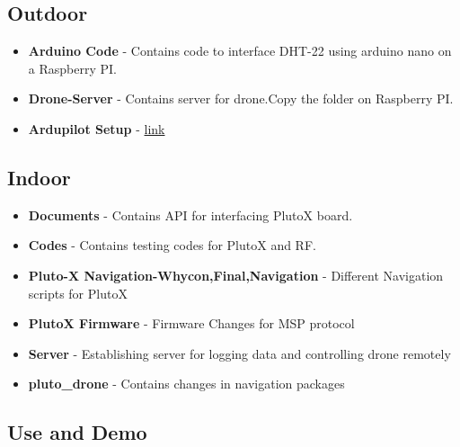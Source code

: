 \documentclass[a4paper,12pt,oneside]{book}
\begin{document}
\subsection*{Outdoor}
\begin{itemize}
\item \textbf{Arduino Code} - Contains code to interface DHT-22 using arduino nano on a Raspberry PI.
\item \textbf{Drone-Server} - Contains server for drone.Copy the folder on Raspberry PI.
\item \textbf{Ardupilot Setup} - \href{https://docs.emlid.com/navio2/}{link}

\end{itemize}

\subsection*{Indoor}
\begin{itemize}
\item \textbf{Documents} - Contains API for interfacing PlutoX board.
\item \textbf{Codes} - Contains testing codes for PlutoX and RF.
\item \textbf{Pluto-X Navigation-Whycon,Final,Navigation} - Different Navigation scripts for PlutoX
\item \textbf{PlutoX Firmware} - Firmware Changes for MSP protocol
\item \textbf{Server} - Establishing server for logging data and controlling drone remotely
\item \textbf{pluto\_drone} - Contains changes in navigation packages 
\end{itemize}


\subsection*{Use and Demo}
\end{document}
